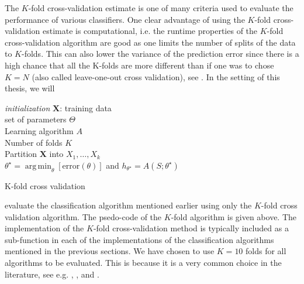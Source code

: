 \documentclass[../thesis.tex]{subfiles}
\begin{document}
\noindent The $K$-fold cross-validation estimate is one of many criteria used to evaluate the performance of various classifiers. One clear advantage of using the $K$-fold cross-validation estimate is computational, i.e. the runtime properties of the $K$-fold cross-validation algorithm are good as one limits the number of splits of the data to $K$-folds. This can also lower the variance of the prediction error since there is a high chance that all the K-folds are more different than if one was to chose $K = N$ (also called leave-one-out cross validation), see \citep{friedman2009elements}. In the setting of this thesis, we will

\begin{algorithm}[H]{
\SetAlgoLined
\textit{initialization}\;
    \hspace{0.5cm} $\mathbf{X}$: training data\\
    \hspace{0.5cm} set of parameters $\Theta$\\
    \hspace{0.5cm} Learning algorithm $A$\\
    \hspace{0.5cm} Number of folds $K$\\
    Partition $\mathbf{X}$ into $X_1, \hdots, X_k$\\
    \Return $\theta^\star = \operatorname {arg\,min}_\theta\left[\text{error}(\theta) \right]$ and $h_{\theta^\star} = A \left(S;\theta^\star \right)$\\
}
\caption{K-fold cross validation}
\end{algorithm}

\noindent evaluate the classification algorithm mentioned earlier using only the $K$-fold cross validation algorithm. The psedo-code of the $K$-fold algorithm is given above. The implementation of the $K$-fold cross-validation method is typically included as a sub-function in each of the implementations of the classification algorithms mentioned in the previous sections. We have chosen to use $K = 10$ folds for all algorithms to be evaluated. This is because it is a very common choice in the literature, see e.g. \cite{liu2014new}, \cite{alonso2015exploring}, \cite{masetic2016congestive} and \cite{koulaouzidis2016telemonitoring}.
\end{document}
